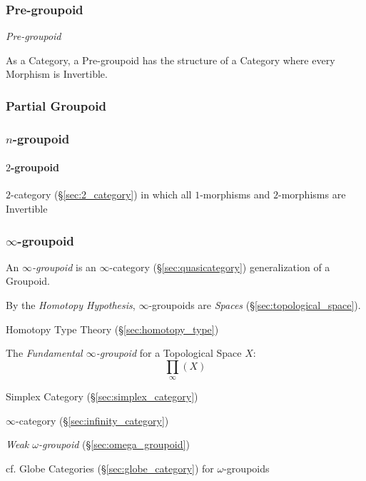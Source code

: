 \subsubsection{Pre-groupoid}\label{sec:pre_groupoid}

\emph{Pre-groupoid}

As a Category, a Pre-groupoid has the structure of a Category where
every Morphism is Invertible.



\subsubsection{Partial Groupoid}\label{sec:partial_groupoid}

\subsubsection{$n$-groupoid}\label{sec:n_groupoid}

\paragraph{$2$-groupoid}\label{sec:2_groupoid}\hfill

$2$-category (\S\ref{sec:2_category}) in which all $1$-morphisms and
$2$-morphisms are Invertible



\subsubsection{$\infty$-groupoid}\label{sec:infinity_groupoid}

An \emph{$\infty$-groupoid} is an $\infty$-category
(\S\ref{sec:quasicategory}) generalization of a Groupoid.

By the \emph{Homotopy Hypothesis}, $\infty$-groupoids are \emph{Spaces}
(\S\ref{sec:topological_space}).

Homotopy Type Theory (\S\ref{sec:homotopy_type})

The \emph{Fundamental $\infty$-groupoid} for a Topological Space $X$:
\[
  \prod_\infty(X)
\]

Simplex Category (\S\ref{sec:simplex_category})

\fist $\infty$-category (\S\ref{sec:infinity_category})

\emph{Weak $\omega$-groupoid} (\S\ref{sec:omega_groupoid})

\fist cf. Globe Categories (\S\ref{sec:globe_category}) for
$\omega$-groupoids

